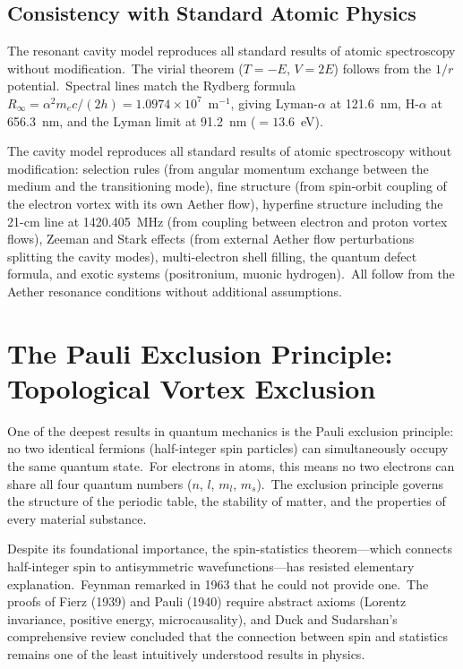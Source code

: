 ﻿\documentclass[12pt,letterpaper]{article}
\begin{document}
\subsection{Consistency with Standard Atomic Physics}

The resonant cavity model reproduces all standard results of atomic
spectroscopy without modification.\ The virial theorem ($T = -E$,
$V = 2E$) follows from the $1/r$ potential.\ Spectral lines match the
Rydberg formula $R_\infty = \alpha^2 m_e c/(2h) = 1.0974 \times
10^7$~m$^{-1}$, giving Lyman-$\alpha$ at 121.6~nm, H-$\alpha$ at
656.3~nm, and the Lyman limit at 91.2~nm ($= 13.6$~eV).

The cavity model reproduces all standard results of atomic spectroscopy
without modification: selection rules (from angular momentum exchange
between the medium and the transitioning mode), fine structure (from
spin-orbit coupling of the electron vortex with its own Aether flow),
hyperfine structure including the 21-cm line at 1420.405~MHz (from
coupling between electron and proton vortex flows), Zeeman and Stark
effects (from external Aether flow perturbations splitting the cavity
modes), multi-electron shell filling, the quantum defect formula, and
exotic systems (positronium, muonic hydrogen).\ All follow from the
Aether resonance conditions without additional assumptions.

\section{The Pauli Exclusion Principle: Topological Vortex Exclusion}
\label{sec:pauli}

One of the deepest results in quantum mechanics is the Pauli exclusion principle:
no two identical fermions (half-integer spin particles) can simultaneously occupy
the same quantum state.\ For electrons in atoms, this means no two electrons can
share all four quantum numbers ($n$, $l$, $m_l$, $m_s$).\ The exclusion principle
governs the structure of the periodic table, the stability of matter, and the
properties of every material substance.

Despite its foundational importance, the spin-statistics theorem---which connects
half-integer spin to antisymmetric wavefunctions---has resisted elementary
explanation.\ Feynman remarked in 1963 that he could not provide one.\ The proofs
of Fierz (1939) and Pauli (1940) require abstract axioms (Lorentz invariance,
positive energy, microcausality), and Duck and Sudarshan's comprehensive review
\cite{duck1997} concluded that the connection between spin and statistics remains
one of the least intuitively understood results in physics.
\end{document}
